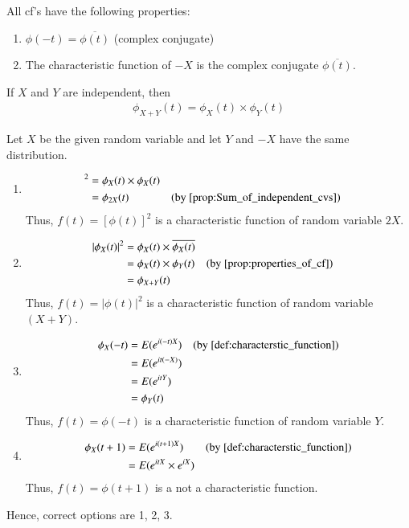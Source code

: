 \documentclass[journal,12pt,twocolumn]{IEEEtran}
\begin{document}
\begin{proposition}
All cf’s have the following properties:\\
\begin{enumerate}
    \item $\phi(-t) =\overline{\phi(t)}$ (complex conjugate)
    \item  The characteristic function of  $ -X$ is the complex conjugate $\overline{\phi(t)}$.
\end{enumerate}
\label{prop:properties_of_cf}
\end{proposition}
\begin{proposition}
 If $X$ and $Y$ are independent, then
 \begin{align*}
     \phi_{X+Y}(t) = \phi_X(t)\times\phi_Y(t)
 \end{align*}
 \label{prop:Sum_of_independent_cvs}
\end{proposition}
Let $X$ be the given random variable and let $Y$  and $-X$ have the same distribution.
\begin{enumerate}
    \item \begin{align*} [\phi_X(t)]^2 &= \phi_X(t)\times\phi_X(t) \\
                &= \phi_{2X}(t) & & \text{(by  \cref{prop:Sum_of_independent_cvs})}
\end{align*}
Thus, $f(t) = [\phi(t)]^2$ is a characteristic function of random variable $2X$.

\item \begin{align*} |\phi_X(t)|^2 &= \phi_X(t)\times\overline{\phi_X(t)} \\
                &= \phi_X(t)\times\phi_Y(t) & & \text{(by  \cref{prop:properties_of_cf})}\\
                &= \phi_{X+Y}(t)
\end{align*}
Thus, $f(t)=|\phi(t)|^2$ is a characteristic function of random variable $(X+Y)$.\\

\item \begin{align*} \phi_X(-t) &= E(e^{i(-t)X}) & & \text{(by  \cref{def:characterstic_function})} \\
                &= E(e^{it(-X)}) \\
                &= E(e^{itY})\\
                &= \phi_Y(t)
\end{align*}
Thus, $f(t) = \phi(-t)$ is a characteristic function of random variable $Y$.

\item \begin{align*} \phi_X(t+1) &= E(e^{i(t+1)X})  & & \text{(by  \cref{def:characterstic_function})} \\
&= E(e^{itX}\times e^{iX}) 
\end{align*}
Thus, $f(t) = \phi(t+1)$ is a not a characteristic function.\\
\end{enumerate}


Hence, correct options are 1, 2, 3.
\end{document}
